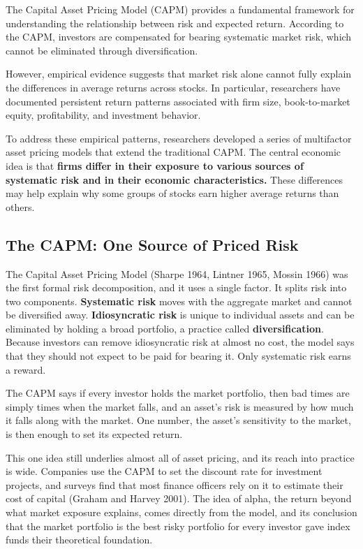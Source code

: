 The Capital Asset Pricing Model (CAPM) provides a fundamental framework for understanding the relationship between risk and expected return. According to the CAPM, investors are compensated for bearing systematic market risk, which cannot be eliminated through diversification. 

However, empirical evidence suggests that market risk alone cannot fully explain the differences in average returns across stocks. In particular, researchers have documented persistent return patterns associated with firm size, book-to-market equity, profitability, and investment behavior.

To address these empirical patterns, researchers developed a series of multifactor asset pricing models that extend the traditional CAPM. The central economic idea is that \textbf{firms differ in their exposure to various sources of systematic risk and in their economic characteristics.} These differences may help explain why some groups of stocks earn higher average returns than others.


\subsection{The CAPM: One Source of Priced Risk}
\label{sec:03-capm}
The Capital Asset Pricing Model (Sharpe 1964, Lintner 1965, Mossin 1966) was the first formal risk decomposition, and it uses a single factor. It splits risk into two components. \textbf{Systematic risk} moves with the aggregate market and cannot be diversified away. \textbf{Idiosyncratic risk} is unique to individual assets and can be eliminated by holding a broad portfolio, a practice called \textbf{diversification}. Because investors can remove idiosyncratic risk at almost no cost, the model says that they should not expect to be paid for bearing it. Only systematic risk earns a reward.

The CAPM says if every investor holds the market portfolio, then bad times are simply times when the market falls, and an asset's risk is measured by how much it falls along with the market. One number, the asset's sensitivity to the market, is then enough to set its expected return.


This one idea still underlies almost all of asset pricing, and its reach into practice is wide. Companies use the CAPM to set the discount rate for investment projects, and surveys find that most finance officers rely on it to estimate their cost of capital (Graham and Harvey 2001). The idea of alpha, the return beyond what market exposure explains, comes directly from the model, and its conclusion that the market portfolio is the best risky portfolio for every investor gave index funds their theoretical foundation.

